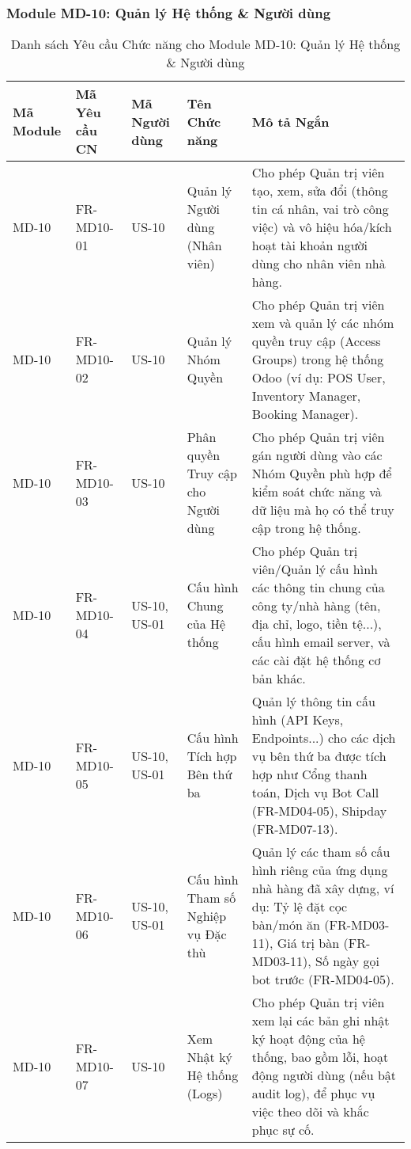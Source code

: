 \subsubsection{Module MD-10: Quản lý Hệ thống \& Người dùng}

\begin{longtable}{|m{2cm}|m{2.5cm}|m{2cm}|m{4.5cm}|m{4cm}|}
\caption{Danh sách Yêu cầu Chức năng cho Module MD-10: Quản lý Hệ thống \& Người dùng} \label{tab:fr_md10} \\
\hline
\textbf{Mã Module} & \textbf{Mã Yêu cầu CN} & \textbf{Mã Người dùng} & \textbf{Tên Chức năng} & \textbf{Mô tả Ngắn} \\
\hline
\endhead %

\hline
\endfoot %

\hline
\endlastfoot %

MD-10 & FR-MD10-01 & US-10 & Quản lý Người dùng (Nhân viên) & Cho phép Quản trị viên tạo, xem, sửa đổi (thông tin cá nhân, vai trò công việc) và vô hiệu hóa/kích hoạt tài khoản người dùng cho nhân viên nhà hàng. \\
\hline
MD-10 & FR-MD10-02 & US-10 & Quản lý Nhóm Quyền & Cho phép Quản trị viên xem và quản lý các nhóm quyền truy cập (Access Groups) trong hệ thống Odoo (ví dụ: POS User, Inventory Manager, Booking Manager). \\
\hline
MD-10 & FR-MD10-03 & US-10 & Phân quyền Truy cập cho Người dùng & Cho phép Quản trị viên gán người dùng vào các Nhóm Quyền phù hợp để kiểm soát chức năng và dữ liệu mà họ có thể truy cập trong hệ thống. \\
\hline
MD-10 & FR-MD10-04 & US-10, US-01 & Cấu hình Chung của Hệ thống & Cho phép Quản trị viên/Quản lý cấu hình các thông tin chung của công ty/nhà hàng (tên, địa chỉ, logo, tiền tệ...), cấu hình email server, và các cài đặt hệ thống cơ bản khác. \\
\hline
MD-10 & FR-MD10-05 & US-10, US-01 & Cấu hình Tích hợp Bên thứ ba & Quản lý thông tin cấu hình (API Keys, Endpoints...) cho các dịch vụ bên thứ ba được tích hợp như Cổng thanh toán, Dịch vụ Bot Call (FR-MD04-05), Shipday (FR-MD07-13). \\
\hline
MD-10 & FR-MD10-06 & US-10, US-01 & Cấu hình Tham số Nghiệp vụ Đặc thù & Quản lý các tham số cấu hình riêng của ứng dụng nhà hàng đã xây dựng, ví dụ: Tỷ lệ đặt cọc bàn/món ăn (FR-MD03-11), Giá trị bàn (FR-MD03-11), Số ngày gọi bot trước (FR-MD04-05). \\
\hline
MD-10 & FR-MD10-07 & US-10 & Xem Nhật ký Hệ thống (Logs) & Cho phép Quản trị viên xem lại các bản ghi nhật ký hoạt động của hệ thống, bao gồm lỗi, hoạt động người dùng (nếu bật audit log), để phục vụ việc theo dõi và khắc phục sự cố. \\
\hline



\end{longtable}
